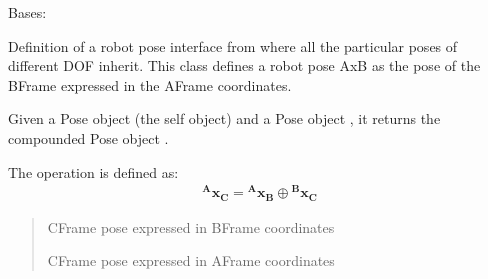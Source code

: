 \documentclass[letterpaper,10pt,english]{sphinxmanual}
\begin{document}
\begin{fulllineitems}
\label{\detokenize{Pose:Pose.Pose}}
\pysigstartsignatures
{}
\pysigstopsignatures
\sphinxAtStartPar
Bases: 

\sphinxAtStartPar
Definition of a robot pose interface from where all the particular poses of different DOF inherit.
This class defines a robot pose AxB as the pose of the B\sphinxhyphen{}Frame expressed in the A\sphinxhyphen{}Frame coordinates.

\begin{fulllineitems}
\label{\detokenize{Pose:Pose.Pose.oplus}}
\pysigstartsignatures
{}
\pysigstopsignatures
\sphinxAtStartPar
Given a Pose object  (the self object) and a Pose object , it returns the compounded Pose object .

\sphinxAtStartPar
The operation is defined as:
\begin{equation}\label{equation:Pose:eq-oplus}
\begin{split}\mathbf{{^A}x_C} = \mathbf{{^A}x_B} \oplus \mathbf{{^B}x_C}\end{split}
\end{equation}
\sphinxAtStartPar
{}
\begin{quote}\begin{description}
\sphinxAtStartPar
{} \textendash{} C\sphinxhyphen{}Frame pose expressed in B\sphinxhyphen{}Frame coordinates

\sphinxAtStartPar
C\sphinxhyphen{}Frame pose expressed in A\sphinxhyphen{}Frame coordinates

\end{description}\end{quote}

\end{fulllineitems}



\end{fulllineitems}
\end{document}
